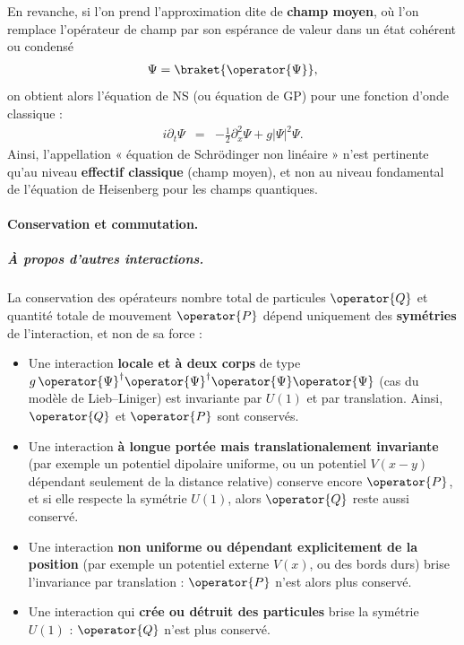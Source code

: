 \medskip

En revanche, si l’on prend l’approximation dite de {\bf champ moyen}, où l’on remplace l’opérateur de champ par son espérance de valeur dans un état cohérent ou condensé
\begin{eqnarray}
	\Psi = \braket{\operator{\Psi}},		
\end{eqnarray}
on obtient alors l’équation de \gls{NS} (ou équation de  \gls{GP}) pour une fonction d’onde classique :
\begin{eqnarray}\label{chap.1:eq.GP.2}
	i \partial_t \Psi	 & = & - \frac{1}{2}\partial_x^2 \Psi + g \vert \Psi \vert^2  \Psi.
\end{eqnarray}
Ainsi, l’appellation « équation de Schrödinger non linéaire » n’est pertinente qu’au niveau {\bf effectif classique} (champ moyen), et non au niveau fondamental de l’équation de Heisenberg pour les champs quantiques.




\paragraph{Conservation et commutation.}

\subparagraph{À propos d’autres interactions.}

La conservation des opérateurs nombre total de particules $\operator{Q}$ et quantité totale de mouvement $\operator{P}$ dépend uniquement des \textbf{symétries} de l’interaction, et non de sa force :  

\begin{itemize}[label = $\bullet$]
    \item Une interaction \textbf{locale et à deux corps} de type $g \, \operator{\Psi}^\dagger \operator{\Psi}^\dagger \operator{\Psi} \operator{\Psi}$ (cas du modèle de Lieb--Liniger) est invariante par $U(1)$ et par translation. Ainsi, $\operator{Q}$ et $\operator{P}$ sont conservés.  

    \item Une interaction \textbf{à longue portée mais translationalement invariante} (par exemple un potentiel dipolaire uniforme, ou un potentiel $V(x-y)$ dépendant seulement de la distance relative) conserve encore $\operator{P}$, et si elle respecte la symétrie $U(1)$, alors $\operator{Q}$ reste aussi conservé.  

    \item Une interaction \textbf{non uniforme ou dépendant explicitement de la position} (par exemple un potentiel externe $V(x)$, ou des bords durs) brise l’invariance par translation : $\operator{P}$ n’est alors plus conservé.  

    \item Une interaction qui \textbf{crée ou détruit des particules} brise la symétrie $U(1)$ : $\operator{Q}$ n’est plus conservé.  
\end{itemize}

